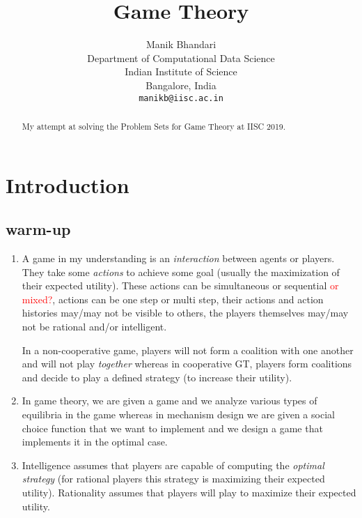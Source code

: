 \documentclass{article}
\title{Game Theory}
\author{
	Manik Bhandari\\
	Department of Computational Data Science\\
	Indian Institute of Science\\
	Bangalore, India \\
	\texttt{manikb@iisc.ac.in} \\
}
\begin{document}
	
	\maketitle
	
	\begin{abstract}
		My attempt at solving the Problem Sets for Game Theory at IISC 2019.
	\end{abstract}
	
\section{Introduction}
\subsection{warm-up}
\begin{enumerate}
	\item A game in my understanding is an \textit{interaction} between agents or players. They take some \textit{actions} to achieve some goal (usually the maximization of their expected utility). These actions can be simultaneous or sequential \textcolor{red}{or mixed?}, actions can be one step or multi step, their actions and action histories may/may not be visible to others, the players themselves may/may not be rational and/or intelligent. 
	
	In a non-cooperative game, players will not form a coalition with one another and will not play \textit{together} whereas in cooperative GT, players form coalitions and decide to play a defined strategy (to increase their utility).
	\item In game theory, we are given a game and we analyze various types of equilibria in the game whereas in mechanism design we are given a social choice function that we want to implement and we design a game that implements it in the optimal case.
	\item Intelligence assumes that players are capable of computing the \textit{optimal strategy} (for rational players this strategy is maximizing their expected utility). Rationality assumes that players will play to maximize their expected utility.
\end{enumerate}
	
	
\end{document}
